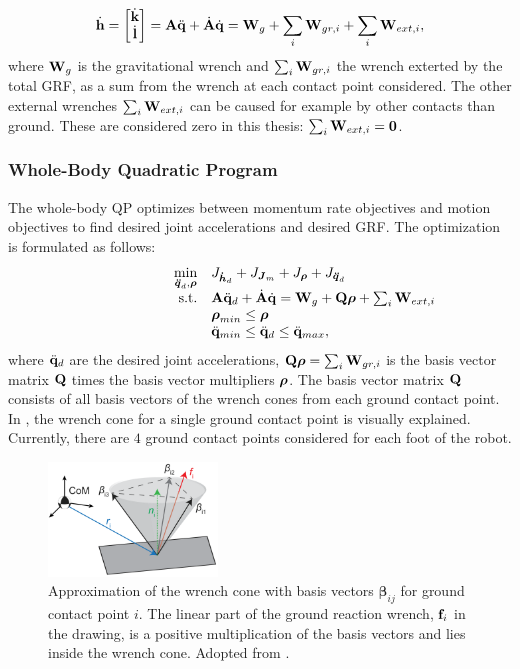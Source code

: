 \begin{equation}
\dot{\mathbf{h}}=\begin{bmatrix}\dot{\mathbf{k}}\\ \dot{\mathbf{l}} \end{bmatrix} =\mathbf{A}\ddot{\mathbf{q}} +\dot{\mathbf{A}}\dot{\mathbf{q}} = \mathbf{W}_g + \sum_i\mathbf{W}_{gr,i} + \sum_i \mathbf{W}_{ext,i}, 
\end{equation}
where $\mathbf{W}_g$ is the gravitational wrench and $\sum_i\mathbf{W}_{gr,i}$ the wrench exterted by the total \ac{GRF}, as a sum from the wrench at each contact point considered. The other external wrenches $\sum_i \mathbf{W}_{ext,i}$ can be caused for example by other contacts than ground. These are considered zero in this thesis: $\sum_i \mathbf{W}_{ext,i}=\mathbf{0}$.
\subsubsection{Whole-Body Quadratic Program} 
The whole-body \ac{QP} \cite{koolen2016design} optimizes between momentum rate objectives and motion objectives to find desired joint accelerations and desired \ac{GRF}. The optimization is formulated as follows:
\begin{equation}
\begin{array}{rlcl}
\displaystyle \min_{\bs{\ddot{q}}_d,\bs{\rho}} & \multicolumn{3}{l}{J_{\bs{\dot{h}}_d} + J_{\bs{J}_m} + J_{\bs{\rho}} + J_{\bs{\ddot{q}}_d} } \\%
\textrm{s.t.} & \matr{A}\ddqjntd + \dot{\matr{A}}\dqjnt = \matr{W}_g + \matr{Q}\bs{\rho}+\sum_i\matr{W}_{ext,i}\\
&\displaystyle \bs{\rho}_{min} \leq \bs{\rho}\\
&\ddot{\qjnt}_{min} \leq \ddqjntd \leq \ddot{\qjnt}_{max},
\end{array}
\end{equation}
where $\ddot{\mathbf{q}}_d$ are the desired joint accelerations, $\mathbf{Q}\boldsymbol{\rho} = \sum_i\mathbf{W}_{gr,i}$ is the basis vector matrix $\mathbf{Q}$ times the basis vector multipliers $\boldsymbol{\rho}$. The basis vector matrix $\mathbf{Q}$ consists of all basis vectors of the wrench cones from each ground contact point. In , the wrench cone for a single ground contact point is visually explained. Currently, there are $4$ ground contact points considered for each foot of the robot.
\begin{figure}
\centering
\includegraphics[width=0.4\textwidth]{STYLESTUFF/wrenchcone.png}
\caption{Approximation of the wrench cone with basis vectors $\boldsymbol{\beta}_{ij}$ for ground contact point $i$. The linear part of the ground reaction wrench, $\mathbf{f}_i$ in the drawing, is a positive multiplication of the basis vectors and lies inside the wrench cone. Adopted from \cite{koolen2016design}. }
\label{fig:wrenchcone}
\end{figure}
